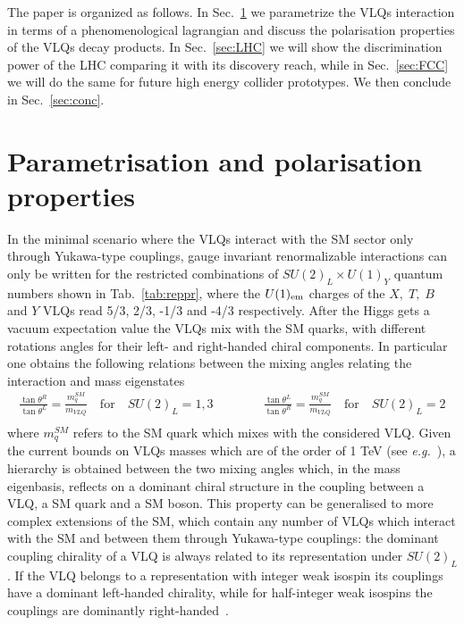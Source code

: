 \documentclass[a4paper]{article}
\begin{document}
The paper is organized as follows. In Sec.~\ref{sec:param} we parametrize the VLQs interaction in terms of a phenomenological lagrangian and discuss the polarisation properties of the VLQs decay products. 
In Sec.~\ref{sec:LHC} we will show the discrimination power of the LHC comparing it with its discovery reach, while in Sec.~\ref{sec:FCC} we will do the same for future high energy collider prototypes.
We then conclude in Sec.~\ref{sec:conc}.

\section{Parametrisation and polarisation properties}
\label{sec:param} 

In the minimal scenario where the VLQs interact with the SM sector only through Yukawa-type couplings,
gauge invariant renormalizable interactions can only be written for the restricted combinations of $SU(2)_L\times U(1)_Y$ quantum numbers shown in Tab.~\ref{tab:reppr}, where the $U(1)_{\rm em}$ charges of the $X,\;T,\;B$ and $Y$ VLQs read 5/3, 2/3, -1/3 and -4/3 respectively. After the Higgs gets a vacuum expectation value the VLQs mix with the SM quarks, with different rotations angles for their left- and right-handed chiral components. In particular one obtains the following relations between the mixing angles relating the interaction and mass eigenstates~\cite{Cacciapaglia:2010vn,Chen:2017hak}
\begin{equation}
\begin{split}
\frac{\tan{\theta^R}}{\tan{\theta^L}} = \frac{m_q^{SM}}{m_{VLQ}} \quad{\textrm{for}}\quad SU(2)_L =1,3 \qquad\qquad
\frac{\tan{\theta^L}}{\tan{\theta^R}} = \frac{m_q^{SM}}{m_{VLQ}} \quad{\textrm{for}}\quad SU(2)_L =2 \\
\end{split}
\end{equation}
where $m_q^{SM}$ refers to the SM quark which mixes with the considered VLQ.
Given the current bounds on VLQs masses which are of the order of 1 TeV (see {\emph{e.g.}}~\cite{Aaboud:2017qpr,CMS:2017wwc}), a hierarchy is obtained between the two mixing angles which, in the mass eigenbasis, reflects on a dominant chiral structure in the coupling between a VLQ, a SM quark and a SM boson. This property can be generalised to more complex extensions of the SM, which contain any number of VLQs which interact with the SM and between them through Yukawa-type couplings: the dominant coupling chirality of a VLQ is always related to its representation under $SU(2)_L$. If the VLQ belongs to a representation with integer weak isospin its couplings have a dominant left-handed chirality, while for half-integer weak isospins the couplings are dominantly right-handed~\cite{delAguila:2000rc,Buchkremer:2013bha}. 
\end{document}
